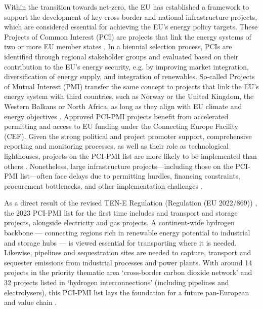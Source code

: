 \documentclass[preprint,12pt,sort&compress]{elsarticle}
\begin{document}
Within the transition towards net-zero, the EU has established a framework to support the development of key cross-border and national infrastructure projects, which are considered essential for achieving the EU's energy policy targets. These Projects of Common Interest (PCI) are projects that link the energy systems of two or more EU member states \cite{europeancommissionRegulationEUNo2022}. In a biennial selection process, PCIs are identified through regional stakeholder groups and evaluated based on their contribution to the EU's energy security, e.g. by improving market integration, diversification of energy supply, and integration of renewables. So-called Projects of Mutual Interest (PMI) transfer the same concept to projects that link the EU's energy system with third countries, such as Norway or the United Kingdom, the Western Balkans or North Africa, as long as they align with EU climate and energy objectives \cite{europeancommissionCommissionDelegatedRegulation2023}. Approved PCI-PMI projects benefit from accelerated permitting and access to EU funding under the Connecting Europe Facility (CEF). Given the strong political and project promoter support, comprehensive reporting and monitoring processes, as well as their role as technological lighthouses, projects on the PCI-PMI list are more likely to be implemented than others \cite{europeancommission.directorategeneralforenergy.InvestmentNeedsEuropean2025}. Nonetheless, large infrastructure projects—including those on the PCI-PMI list—often face delays due to permitting hurdles, financing constraints, procurement bottlenecks, and other implementation challenges \cite{acerConsolidatedReportProgress2023}. 

As a direct result of the revised TEN-E Regulation (Regulation (EU 2022/869)) \cite{europeanparliamentRegulationEU20222022}, the 2023 PCI-PMI list \cite{europeancommissionCommissionDelegatedRegulation2023,europeancommissionPCIPMITransparencyPlatform2024} for the first time includes  and  transport and storage projects, alongside electricity and gas projects. A continent-wide hydrogen backbone --- connecting regions rich in renewable energy potential to industrial and storage hubs --- is viewed essential for transporting  where it is needed. Likewise,  pipelines and sequestration sites are needed to capture, transport and sequester emissions from industrial processes and power plants. With around 14 projects in the priority thematic area `cross-border carbon dioxide network' and 32 projects listed in `hydrogen interconnections' (including pipelines and electrolysers), this PCI-PMI list lays the foundation for a future pan-European  and  value chain \cite{europeancommissionAnnexFirstUnion2023}.
\end{document}
